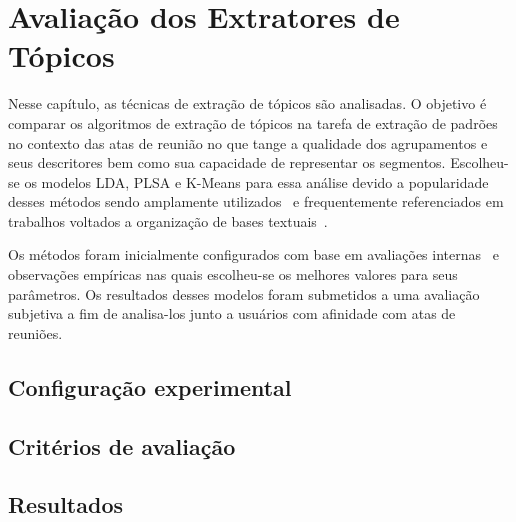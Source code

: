 
\chapter{Avaliação dos Extratores de Tópicos}\label{cap-extratores}



% 

Nesse capítulo, as técnicas de extração de tópicos são analisadas. O objetivo é comparar os algoritmos de extração de tópicos na tarefa de extração de padrões no contexto das atas de reunião no que tange a qualidade dos agrupamentos e seus descritores bem como sua capacidade de representar os segmentos. Escolheu-se os modelos LDA, PLSA e K-Means para essa análise devido a popularidade desses métodos sendo amplamente utilizados~\cite{DZhu20122} e frequentemente referenciados em trabalhos voltados a organização de bases textuais~\cite{Aggarwal2018, OCallaghan2015, Steyvers2007}.


Os métodos foram inicialmente configurados com base em avaliações internas~\cite{Hassani2017} e observações empíricas nas quais escolheu-se os melhores valores para seus parâmetros. Os resultados desses modelos foram submetidos a uma avaliação subjetiva a fim de analisa-los junto a usuários com afinidade com atas de reuniões.




\section{Configuração experimental}




\section{Critérios de avaliação}


\section{Resultados}


